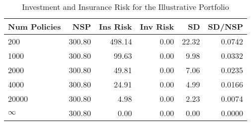 \begin{table}[!htpb]
\centering
\begingroup\small
\begin{tabular}{lrrrrr}
  \hline
Num Policies & NSP & Ins Risk & Inv Risk & SD & SD/NSP \\ 
  \hline
200 & 300.80 & 498.14 & 0.00 & 22.32 & 0.0742 \\ 
  1000 & 300.80 & 99.63 & 0.00 & 9.98 & 0.0332 \\ 
  2000 & 300.80 & 49.81 & 0.00 & 7.06 & 0.0235 \\ 
  4000 & 300.80 & 24.91 & 0.00 & 4.99 & 0.0166 \\ 
  20000 & 300.80 & 4.98 & 0.00 & 2.23 & 0.0074 \\ 
  $\infty$ & 300.80 & 0.00 & 0.00 & 0.00 & 0.0000 \\ 
   \hline
\end{tabular}
\endgroup
\caption{Investment and Insurance Risk for the Illustrative Portfolio} 
\label{tab:risktableDeterm}
\end{table}

